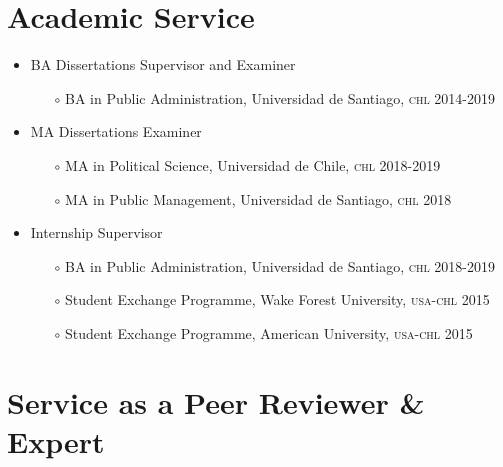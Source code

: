 \documentclass[letterpaper,margin]{res}
\begin{document}
\begin{resume}

\section{\footnotesize Academic Service}

\begin{itemize}
\item{\small BA Dissertations Supervisor and Examiner }
\begin{itemize}
\item[$\circ$]{\small BA in Public Administration, Universidad de Santiago, {\scshape chl} 2014-2019}
\end{itemize}
\item{\small MA Dissertations Examiner}
\begin{itemize}
\item[$\circ$]{\small MA in Political Science, Universidad de Chile, {\scshape chl} 2018-2019}
\item[$\circ$]{\small MA in Public Management, Universidad de Santiago, {\scshape chl} 2018}
\end{itemize}
\item{\small Internship Supervisor}
\begin{itemize}
\item[$\circ$]{\small BA in Public Administration, Universidad de Santiago, {\scshape chl} 2018-2019}
\item[$\circ$]{\small Student Exchange Programme, Wake Forest University, {\scshape usa-chl} 2015}
\item[$\circ$]{\small Student Exchange Programme, American University, {\scshape usa-chl} 2015}
\end{itemize}
\end{itemize}



\section{\footnotesize Service as a Peer Reviewer \& Expert}


\end{resume}
\end{document}
